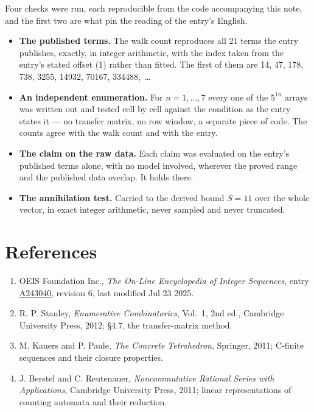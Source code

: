 \documentclass[11pt]{article}
\theoremstyle{definition}
\begin{document}
Four checks were run, each reproducible from the code accompanying this note, and the first two are what pin the reading of the entry's English.

\begin{itemize}

\item {\bfseries The published terms.} The walk count reproduces all 21 terms the entry publishes, exactly, in integer arithmetic, with the index taken from the entry's stated offset (1) rather than fitted. The first of them are 14, 47, 178, 738, 3255, 14932, 70167, 334488,~\dots

\item {\bfseries An independent enumeration.} For $n = 1,\dots,7$ every one of the $5^{1n}$ arrays was written out and tested cell by cell against the condition as the entry states it --- no transfer matrix, no row window, a separate piece of code. The counts agree with the walk count and with the entry.

\item {\bfseries The claim on the raw data.} Each claim was evaluated on the entry's published terms alone, with no model involved, wherever the proved range and the published data overlap. It holds there.

\item {\bfseries The annihilation test.} Carried to the derived bound $S = 11$ over the whole vector, in exact integer arithmetic, never sampled and never truncated.

\end{itemize}

\section{References}

\begin{enumerate}

\item OEIS Foundation Inc., \emph{The On-Line Encyclopedia of Integer Sequences}, entry \href{https://oeis.org/A243040}{A243040}, revision 6, last modified Jul 23 2025.

\item R. P. Stanley, \emph{Enumerative Combinatorics}, Vol.~1, 2nd ed., Cambridge University Press, 2012; \S4.7, the transfer-matrix method.

\item M. Kauers and P. Paule, \emph{The Concrete Tetrahedron}, Springer, 2011; C-finite sequences and their closure properties.

\item J. Berstel and C. Reutenauer, \emph{Noncommutative Rational Series with Applications}, Cambridge University Press, 2011; linear representations of counting automata and their reduction.

\end{enumerate}
\end{document}
